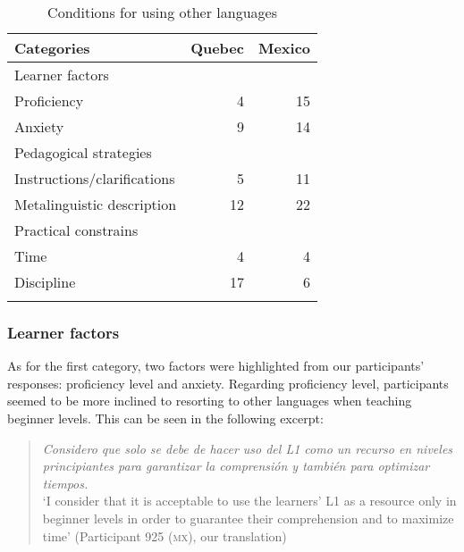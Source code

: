 \documentclass[output=paper]{../langscibook}
\begin{document}
\begin{table}

\begin{tabular}{lrr}
\lsptoprule
Categories & Quebec & Mexico\\\midrule
Learner factors \\
Proficiency & 4 & 15\\
Anxiety & 9 & 14\\\midrule
Pedagogical strategies \\
Instructions\slash clarifications & 5 & 11\\
Metalinguistic description & 12 & 22\\\midrule
Practical constrains\\
Time & 4 & 4\\
Discipline & 17 & 6\\
\lspbottomrule
\end{tabular}
\caption{Conditions for using other languages\label{tab:paquet:1}}
\end{table}


\subsubsection{Learner factors}


As for the first category, two factors were highlighted from our participants’ responses: proficiency level and anxiety. Regarding proficiency level, participants seemed to be more inclined to resorting to other languages when teaching beginner levels. This can be seen in the following excerpt:

\begin{quote}
\emph{Considero que solo se debe de hacer uso del L1 como un recurso en niveles principiantes para garantizar la comprensión y también para optimizar tiempos.}\smallskip\\
`I consider that it is acceptable to use the learners’ L1 as a resource only in beginner levels in order to guarantee their comprehension and to maximize time' (Participant 925 (\textsc{mx}), our translation)
\end{quote}
\end{document}
